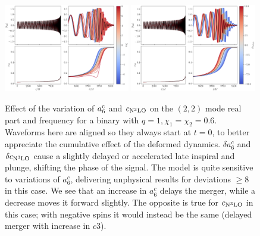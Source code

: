 \documentclass[prd,amssymb,amsmath,amsfonts,nofootinbib,reprint,showpacs,longbibliography]{revtex4-1}
\def\c3{c_{\rm{N}^3\rm{LO}}}
\begin{document}
\begin{figure}
    \includegraphics[width=0.49\textwidth]{figs/delta_a6c_-8.0_8.0.png}
    \includegraphics[width=0.49\textwidth]{figs/delta_cN3LO_-10.0_10.0.png}
    \caption{Effect of the variation of $a_6^{\rm c}$ and $\c3$ on the $(2,2)$ mode real part and frequency
    for a binary with $q = 1, \chi_1 = \chi_2 = 0.6$. Waveforms here are aligned so they always start at $t = 0$,
    to better appreciate the cumulative effect of the deformed dynamics. $\delta a_6^c$ and $\delta \c3$ cause a slightly
    delayed or accelerated late inspiral and plunge, shifting the phase of the signal. The model is quite
    sensitive to variations of $a_6^c$, delivering unphysical results for deviations $\geq 8$ in this case.
    We see that an increase in $a_6^c$ delays the merger, while a decrease moves it forward slightly. The
    opposite is true for $\c3$ in this case; with negative spins it would instead be the same (delayed merger with
    increase in $c3$).}
\end{figure}
\end{document}
